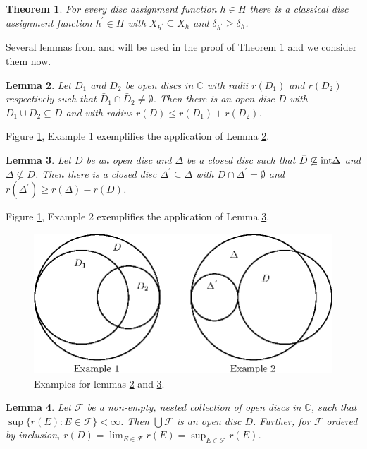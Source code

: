 \documentclass{strippedproc-l}
\newtheorem{theorem}{Theorem}[section]
\newtheorem{lemma}[theorem]{Lemma}
\theoremstyle{definition}
\theoremstyle{remark}
\numberwithin{equation}{section}
\begin{document}
\begin{theorem} 
For every disc assignment function $h\in H$ there is a classical disc assignment function $h^{'}\in H$ with $X_{h^{'}}\subseteq X_{h}$ and $\delta_{h^{'}}\ge\delta_{h}$.
\label{the:HT}
\end{theorem}
Several lemmas from \cite{Feinstein-Heath} and \cite{Heath} will be used in the proof of Theorem \ref{the:HT} and we consider them now.
\begin{lemma}
Let $D_{1}$ and $D_{2}$ be open discs in $\mathbb{C}$ with radii $r(D_{1})$ and $r(D_{2})$ respectively such that $\bar{D}_{1}\cap\bar{D}_{2}\not=\emptyset$. Then there is an open disc $D$ with $D_{1}\cup D_{2}\subseteq D$ and with radius $r(D)\le r(D_{1})+r(D_{2})$.
\label{lem:2.4.13}
\end{lemma}
Figure \ref{fig:disclemmas}, Example 1 exemplifies the application of Lemma \ref{lem:2.4.13}.
\begin{lemma}
Let $D$ be an open disc and $\Delta$ be a closed disc such that $\bar{D}\not\subseteq\mbox{\textup{int}}\Delta$ and $\Delta\not\subseteq\bar{D}$. Then there is a closed disc $\Delta^{'}\subseteq\Delta$ with $D\cap\Delta^{'}=\emptyset$ and $r(\Delta^{'})\ge r(\Delta)-r(D)$.
\label{lem:2.4.14}
\end{lemma}
Figure \ref{fig:disclemmas}, Example 2 exemplifies the application of Lemma \ref{lem:2.4.14}.
\begin{figure}
\includegraphics{mason-fig-1}
\caption{Examples for lemmas \ref{lem:2.4.13} and \ref{lem:2.4.14}.}
\label{fig:disclemmas}
\end{figure}
\begin{lemma}
Let $\mathcal{F}$ be a non-empty, nested collection of open discs in $\mathbb{C}$, such that $\sup\{r(E):E\in\mathcal{F}\}<\infty$. Then $\bigcup\mathcal{F}$ is an open disc $D$. Further, for $\mathcal{F}$ ordered by inclusion, $r(D)=\lim_{E\in\mathcal{F}}r(E)=\sup_{E\in\mathcal{F}}r(E)$. 
\label{lem:2.4.11} 
\end{lemma}
\end{document}
